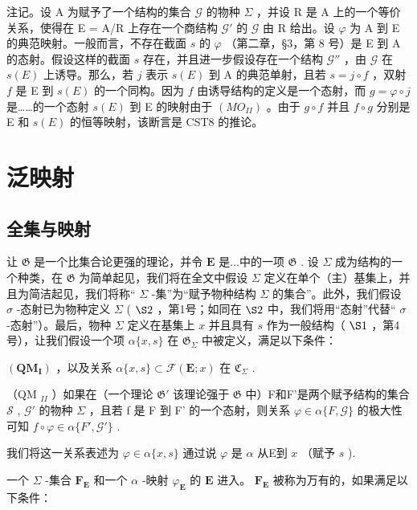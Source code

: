 注记。设 A 为赋予了一个结构的集合 \(\mathcal{G}\) 的物种 \(\Sigma\) ，并设 R 是 A 上的一个等价关系，使得在 E = A/R 上存在一个商结构 \(\mathcal{G}'\) 的 \(\mathcal{G}\) 由 R 给出。设 \(\varphi\) 为 A 到 E 的典范映射。一般而言，不存在截面 \(s\) 的 \(\varphi\) （第二章，§3，第 8 号）是 E 到 A 的态射。假设这样的截面 \(s\) 存在，并且进一步假设存在一个结构 \(\mathcal{G}''\) ，由 \(\mathcal{G}\) 在 \(s(E)\) 上诱导。那么，若 \(j\) 表示 \(s(E)\) 到 A 的典范单射，且若 \(s = j \circ f\) ，双射 \(f\) 是 E 到 \(s(E)\) 的一个同构。因为 \(f\) 由诱导结构的定义是一个态射，而 \(g = \varphi \circ j\) 是……的一个态射 \(s(E)\) 到 E 的映射由于 \((MO_{II})\) 。由于 \(g \circ f\) 并且 \(f \circ g\) 分别是 E 和 \(s(E)\) 的恒等映射，该断言是 CST8 的推论。

\section{泛映射}

\subsection{全集与映射}

让 \(\mathfrak{G}\) 是一个比集合论更强的理论，并令 \(\mathbf{E}\) 是...中的一项 \(\mathfrak{G}\) . 设 \(\Sigma\) 成为结构的一个种类，在 \(\mathfrak{G}\) 为简单起见，我们将在全文中假设 \(\Sigma\) 定义在单个（主）基集上，并且为简洁起见，我们将称“ \(\Sigma\) -集”为“赋予物种结构 \(\Sigma\) 的集合”。此外，我们假设 \(\sigma\) -态射已为物种定义 \(\Sigma\) ( \(\S 2\) ，第1号；如同在 \(\S 2\) 中，我们将用“态射”代替“ \(\sigma\) -态射”）。最后，物种 \(\Sigma\) 定义在基集上 \(x\) 并且具有 \(s\) 作为一般结构（ \(\S 1\) ，第4号），让我们假设一个项 \(\alpha \{x, s\}\) 在 \(\mathfrak{G}_{\Sigma}\) 中被定义，满足以下条件：

\((\mathbf{Q}\mathbf{M}_{\mathbf{I}})\) ，以及关系 \(\alpha \{x,s\} \subset \mathcal{F}(\mathbf{E};x)\) 在 \(\mathfrak{C}_{\Sigma}\) .

（QM \(_{II}\) ）如果在（一个理论 \(\mathfrak{G}'\) 该理论强于 \(\mathfrak{G}\) 中）F和F'是两个赋予结构的集合 \(\mathscr{S}\) , \(\mathscr{G}'\) 的物种 \(\Sigma\) ，且若 f 是 F 到 F' 的一个态射，则关系 \(\varphi \in \alpha \{F, \mathscr{G}\}\) 的极大性可知 \(f \circ \varphi \in \alpha \{F', \mathscr{G}'\}\) .

我们将这一关系表述为 \(\varphi\in\alpha\{x,s\}\) 通过说 \(\varphi\) 是 \(\alpha\) 从E到 \(x\) （赋予 \(s\) ).

一个 \(\Sigma\) -集合 \(\mathbf{F}_{\mathbf{E}}\) 和一个 \(\alpha\) -映射 \(\varphi_{\mathbf{E}}\) 的 \(\mathbf{E}\) 进入。 \(\mathbf{F}_{\mathbf{E}}\) 被称为万有的，如果满足以下条件：

